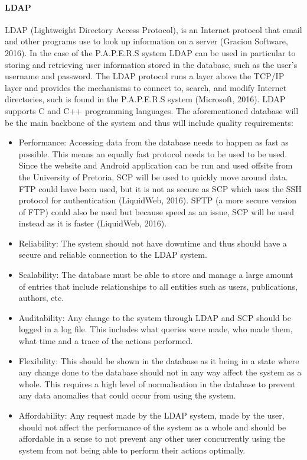 \documentclass{article}
\begin{document}
			\paragraph{LDAP}
				LDAP (Lightweight Directory Access Protocol), is an Internet protocol that email and other programs use to look up information on a server (Gracion Software, 2016). In the case of the P.A.P.E.R.S system LDAP can be used in particular to storing and retrieving user information stored in the database, such as the user’s username and password. The LDAP protocol runs a layer above the TCP/IP layer and provides the mechanisms to connect to, search, and modify Internet directories, such is found in the P.A.P.E.R.S system (Microsoft, 2016). LDAP supports C and C++ programming languages. The aforementioned database will be the main backbone of the system and thus will include quality requirements:
			\begin{itemize}  
        		\item Performance: Accessing data from the database needs to happen as fast as possible. This means an equally fast protocol needs to be used to be used. Since the website and Android application can be run and used offsite from the University of Pretoria, SCP will be used to quickly move around data. FTP could have been used, but it is not as secure as SCP which uses the SSH protocol for authentication (LiquidWeb, 2016). SFTP (a more secure version of FTP) could also be used but because speed as an issue, SCP will be used instead as it is faster (LiquidWeb, 2016).
        		\item Reliability: The system should not have downtime and thus should have a secure and reliable connection to the LDAP system.
       			\item Scalability: The database must be able to store and manage a large amount of entries that include relationships to all entities such as users, publications, authors, etc. 
        		\item Auditability: Any change to the system through LDAP and SCP should be logged in a log file. This includes what queries were made, who made them, what time and a trace of the actions performed.
        		\item Flexibility: This should be shown in the database as it being in a state where any change done to the database should not in any way affect the system as a whole. This requires a high level of normalisation in the database to prevent any data anomalies that could occur from using the system.
        		\item Affordability: Any request made by the LDAP system, made by the user, should not affect the performance of the system as a whole and should be affordable in a sense to not prevent any other user concurrently using the system from not being able to perform their actions optimally.
    		\end{itemize}
    		
\end{document}
